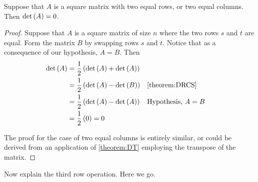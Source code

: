 \documentclass{ximera}
\begin{document}
\begin{theorem}
  \label{theorem:DERC}

  Suppose that $A$ is a square matrix with two equal rows, or two
  equal columns.  Then $\det\left(A\right)=0$.

  \begin{proof}
    Suppose that $A$ is a square matrix of size $n$ where the two rows
    $s$ and $t$ are equal.  Form the matrix $B$ by swapping rows $s$
    and $t$.  Notice that as a consequence of our hypothesis, $A=B$.
    Then
    \begin{align*}
      \det\left(A\right)
      &=
        \frac{1}{2}\left(\det\left(A\right)+\det\left(A\right)\right)\\
      &=
        \frac{1}{2}\left(\det\left(A\right)-\det\left(B\right)\right)
      &&\ref{theorem:DRCS}\\
      &=
        \frac{1}{2}\left(\det\left(A\right)-\det\left(A\right)\right)
      &&\text{Hypothesis, $A=B$}\\
      &=
        \frac{1}{2}\,(0)=0
    \end{align*}

    The proof for the case of two equal columns is entirely similar,
    or could be derived from an application of \ref{theorem:DT}
    employing the transpose of the matrix.

  \end{proof}
\end{theorem}

Now explain the third row operation.  Here we go.
\end{document}
